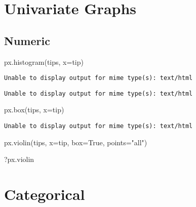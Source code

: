 \documentclass[
  letterpaper,
  DIV=11,
  numbers=noendperiod]{scrreprt}
\newenvironment{Shaded}{\begin{snugshade}}{\end{snugshade}}
\newcommand{\NormalTok}[1]{\textcolor[rgb]{0.00,0.23,0.31}{#1}}
\newcommand{\OperatorTok}[1]{\textcolor[rgb]{0.37,0.37,0.37}{#1}}
\newcommand{\StringTok}[1]{\textcolor[rgb]{0.13,0.47,0.30}{#1}}
\newcommand{\VariableTok}[1]{\textcolor[rgb]{0.07,0.07,0.07}{#1}}
\begin{document}
\chapter{Univariate Graphs}\label{univariate-graphs}

\section{Numeric}\label{numeric}

\begin{Shaded}
\begin{Highlighting}[]
\NormalTok{px.histogram(tips, x}\OperatorTok{=}\StringTok{\textquotesingle{}tip\textquotesingle{}}\NormalTok{)}
\end{Highlighting}
\end{Shaded}

\begin{verbatim}
Unable to display output for mime type(s): text/html
\end{verbatim}

\begin{verbatim}
Unable to display output for mime type(s): text/html
\end{verbatim}

\begin{Shaded}
\begin{Highlighting}[]
\NormalTok{px.box(tips, x}\OperatorTok{=}\StringTok{\textquotesingle{}tip\textquotesingle{}}\NormalTok{)}
\end{Highlighting}
\end{Shaded}

\begin{verbatim}
Unable to display output for mime type(s): text/html
\end{verbatim}

\begin{Shaded}
\begin{Highlighting}[]
\NormalTok{px.violin(tips, x}\OperatorTok{=}\StringTok{\textquotesingle{}tip\textquotesingle{}}\NormalTok{, box}\OperatorTok{=}\VariableTok{True}\NormalTok{, points}\OperatorTok{=}\StringTok{"all"}\NormalTok{)}

\NormalTok{?px.violin}
\end{Highlighting}
\end{Shaded}

\chapter{Categorical}\label{categorical}
\end{document}
